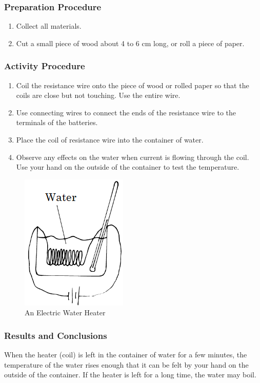\subsubsection*{Preparation Procedure}
\begin{enumerate}
\item{Collect all materials.} 
\item{Cut a small piece of wood about 4 to 6 cm long, or roll a piece of paper.} 
\end{enumerate}

\subsubsection*{Activity Procedure}
\begin{enumerate}
\item{Coil the resistance wire onto the piece of wood or rolled paper so that the coils are close but not touching. Use the entire wire.} 
\item{Use connecting wires to connect the ends of the resistance wire to the terminals of the batteries.} 
\item{Place the coil of resistance wire into the container of water.} 
\item{Observe any effects on the water when current is flowing through the coil. Use your hand on the outside of the container to test the temperature.} 
\end{enumerate}

\begin{figure}[h]
\begin{center}
\includegraphics{./img/electric-heater.png}
\caption{An Electric Water Heater}
\label{fig:electric-heater}
\end{center}
\end{figure}

\subsubsection*{Results and Conclusions}
When the heater (coil) is left in the container of water for a few minutes, the temperature of the water rises enough that it can be felt by your hand on the outside of the container. If the heater is left for a long time, the water may boil.  

